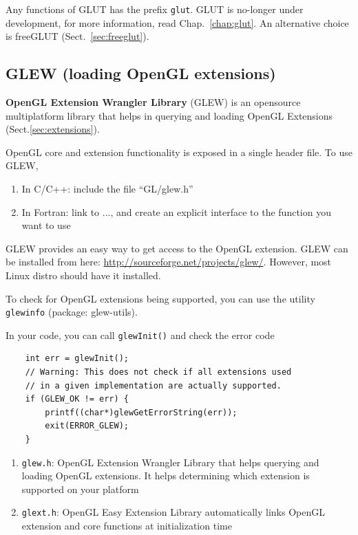 Any functions of GLUT has the prefix \verb!glut!. GLUT is no-longer
under development, for more information, read Chap.~\ref{chap:glut}. An
alternative choice is freeGLUT (Sect.~\ref{sec:freeglut}).

\subsection{GLEW (loading OpenGL extensions)}
\label{sec:glew}

{\bf OpenGL Extension Wrangler Library} (GLEW) is an opensource multiplatform
library that helps in querying and loading OpenGL Extensions
(Sect.\ref{sec:extensions}).

OpenGL core and extension functionality is exposed in a single header file.
To use GLEW, 
\begin{enumerate}
\item In C/C++: include the file ``GL/glew.h''
\item In Fortran: link to ..., and create an explicit interface to the
  function you want to use
\end{enumerate}

GLEW provides an easy way to get access to the OpenGL extension.  GLEW
can be installed from here:
\url{http://sourceforge.net/projects/glew/}. However, most Linux
distro should have it installed.  

To check for OpenGL extensions being supported, you can use the utility
\verb!glewinfo! (package: glew-utils).

In your code, you can call \verb!glewInit()! and check the error code
\begin{verbatim}
    int err = glewInit();
    // Warning: This does not check if all extensions used
    // in a given implementation are actually supported.
    if (GLEW_OK != err) {
        printf((char*)glewGetErrorString(err));
        exit(ERROR_GLEW);
    }
\end{verbatim}

\begin{enumerate}
\item \verb!glew.h!: OpenGL Extension Wrangler Library that helps
  querying and loading OpenGL extensions. It helps determining which
  extension is supported on your platform

\item \verb!glext.h!: OpenGL Easy Extension Library automatically
  links OpenGL extension and core functions at initialization time
\end{enumerate}

